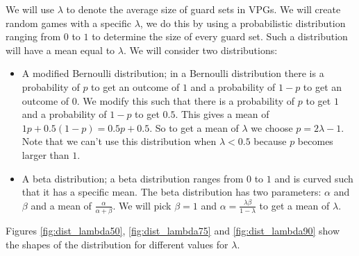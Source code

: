 We will use $\lambda$ to denote the average size of guard sets in VPGs. We will create random games with a specific $\lambda$, we do this by using a probabilistic distribution ranging from $0$ to $1$ to determine the size of every guard set. Such a distribution will have a mean equal to $\lambda$. We will consider two distributions:
\begin{itemize}
	\item A modified Bernoulli distribution; in a Bernoulli distribution there is a probability of $p$ to get an outcome of $1$ and a probability of $1-p$ to get an outcome of $0$. We modify this such that there is a probability of $p$ to get $1$ and a probability of $1-p$ to get $0.5$. This gives a mean of $1p + 0.5(1-p) = 0.5p + 0.5$. So to get a mean of $\lambda$ we choose $p = 2\lambda - 1$. Note that we can't use this distribution when $\lambda < 0.5$ because $p$ becomes larger than $1$.
	\item A beta distribution; a beta distribution ranges from $0$ to $1$ and is curved such that it has a specific mean. The beta distribution has two parameters: $\alpha$ and $\beta$ and a mean of $\frac{\alpha}{\alpha+\beta}$. We will pick $\beta=1$ and $\alpha = \frac{\lambda\beta}{1-\lambda}$ to get a mean of $\lambda$.
\end{itemize}
Figures \ref{fig:dist_lambda50}, \ref{fig:dist_lambda75} and \ref{fig:dist_lambda90} show the shapes of the distribution for different values for $\lambda$.
